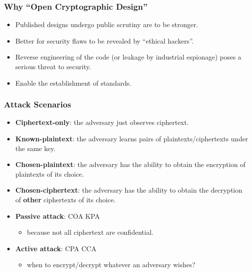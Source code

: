\begin{frame}\frametitle{Why ``Open Cryptographic Design''}
\begin{itemize}
\item Published designs undergo public scrutiny are to be stronger.
\item Better for security flaws to be revealed by ``ethical hackers''.
\item Reverse engineering of the code (or leakage by industrial espionage) poses a serious threat to security.
\item Enable the establishment of standards.
\end{itemize}
\end{frame}
\begin{frame}\frametitle{Attack Scenarios}	
\begin{itemize}
\item \textbf{Ciphertext-only}: the adversary just observes ciphertext.
\item \textbf{Known-plaintext}: the adversary learns pairs of plaintexts/ciphertexts under the same key.
\item \textbf{Chosen-plaintext}: the adversary has the ability to obtain the encryption of plaintexts of its choice.
\item \textbf{Chosen-ciphertext}: the adversary has the ability to obtain the decryption of \textbf{other} ciphertexts of its choice.
\item \textbf{Passive attack}: COA KPA
\begin{itemize}
\item because not all ciphertext are confidential.
\end{itemize}
\item \textbf{Active attack}: CPA CCA
\begin{itemize}
\item when to encrypt/decrypt whatever an adversary wishes?
\end{itemize}
\end{itemize}	
\end{frame}

